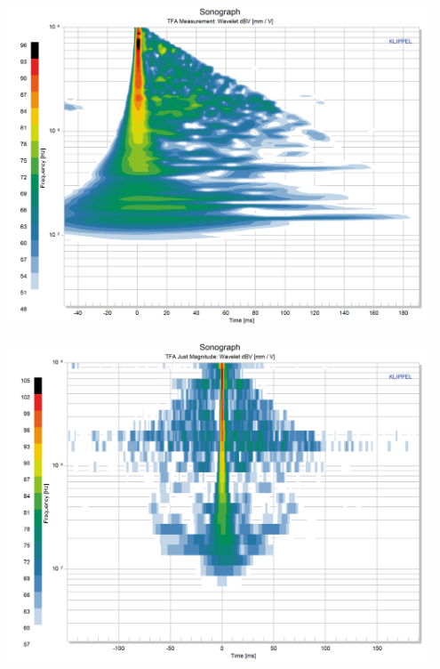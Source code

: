 \documentclass{report}
\begin{document}
\begin{minipage}{0.248\textwidth}
\begin{center}
	\includegraphics[width=0.95\textwidth]{RoomComp/Sonograph_Meas} 
    \captionsetup{hypcap=false} 
	\label{fig:comp_meas}
\end{center}
\end{minipage}
\begin{minipage}{0.248\textwidth}
\begin{center}
	\includegraphics[width=0.95\textwidth]{RoomComp/Sonograph_MagFilt} 
    \captionsetup{hypcap=false} 
	\label{fig:comp_mag}
\end{center}
\end{minipage}
\end{document}
